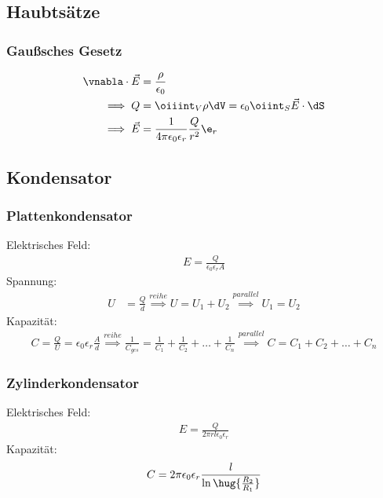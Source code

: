 \documentclass[11pt,letterpaper]{article}
\begin{document}
\subsection{Haubtsätze}
\subsubsection{Gaußsches Gesetz}
\begin{align*}
    \vnabla \cdot \vec E &= \frac \rho {\epsilon_0}\\
    \implies Q &= \oiiint_{V} \rho \dV = \epsilon_0\oiint_{S} \vec E \cdot \dS\\
    \implies \vec E &= \frac{1}{4\pi \epsilon_0 \epsilon_r} \frac{Q}{r^2}\e_r\\
\end{align*}

\subsection{Kondensator}

\subsubsection{Plattenkondensator}
Elektrisches Feld:
\begin{align*}
    E = \frac{Q}{\epsilon_0\epsilon_r A}
\end{align*}
Spannung:
\begin{align*}
    U &= \frac Qd \overset{reihe}{\implies}U =U_1+U_2 \overset{parallel}{\implies} U_1=U_2
\end{align*}
Kapazität:
\begin{align*}
    C = \frac{Q}{U} = \epsilon_0\epsilon_r \frac{A}{d} 
    \overset{reihe}{\implies} \frac{1}{C_{ges}}= \frac{1}{C_1} + \frac{1}{C_2} + \dots + \frac{1}{C_n}
    \overset{parallel}{\implies} C=C_1 + C_2 + \dots + C_n
\end{align*}

\subsubsection{Zylinderkondensator}
Elektrisches Feld:
\begin{align*}
    E = \frac{Q}{2\pi r l \epsilon_0\epsilon_r}
\end{align*}
Kapazität:
\begin{align*}
    C = 2\pi \epsilon_0\epsilon_r \frac{l}{\ln\hug{\frac{R_2}{R_1}}} 
\end{align*}
\end{document}
